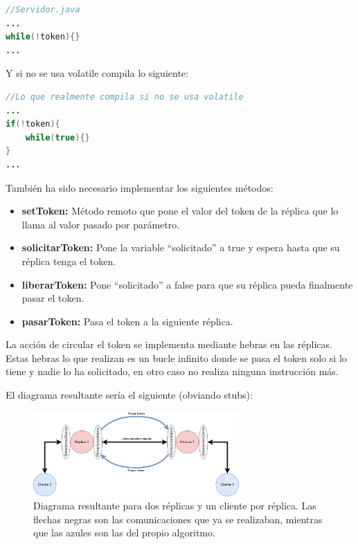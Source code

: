 \documentclass{article}
\begin{document}
\begin{lstlisting}[language=Java]
//Servidor.java
...
while(!token){}
...
\end{lstlisting}

Y si no se usa volatile compila lo siguiente:

\begin{lstlisting}[language=Java]
//Lo que realmente compila si no se usa volatile
...
if(!token){
    while(true){}
}
...
\end{lstlisting} 


También ha sido necesario implementar los siguientes métodos:

\begin{itemize}
    \item \textbf{setToken: }Método remoto que pone el valor del token de la réplica que lo llama al valor pasado por parámetro.
    \item \textbf{solicitarToken: }Pone la variable ``solicitado'' a true y espera hasta que su réplica tenga el token.
    \item \textbf{liberarToken: }Pone ``solicitado'' a false para que su réplica pueda finalmente pasar el token.
    \item \textbf{pasarToken: }Pasa el token a la siguiente réplica.
\end{itemize}

La acción de circular el token se implementa mediante hebras en las réplicas. Estas hebras lo que realizan es un bucle infinito donde se pasa el token solo si lo tiene y nadie lo ha solicitado, en otro caso no realiza ninguna instrucción más.

El diagrama resultante sería el siguiente (obviando stubs):

\begin{figure}[H]
    \centering
    \includegraphics[width=0.7\textwidth]{imagenes/diagramaAnillo.png}
    \caption{Diagrama resultante para dos réplicas y un cliente por réplica. Las flechas negras son las comunicaciones que ya se realizaban, mientras que las azules son las del propio algoritmo.}
\end{figure}
\end{document}
